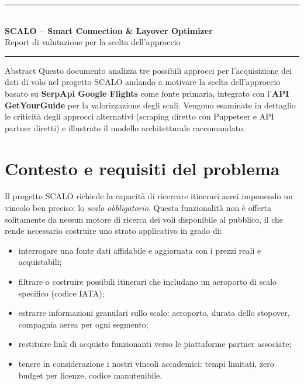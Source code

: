 \documentclass[a4paper, 11pt]{article}
\begin{document}
\begin{center}
  {\color{black}\rule{\textwidth}{2pt}}\\[10pt]
  {\fontsize{18}{16}\selectfont\bfseries\color{black}SCALO -- Smart Connection \& Layover Optimizer}\\[5pt]
  {\normalsize\color{muted}Report di valutazione per la scelta dell'approccio}\\[10pt]
  {\color{black}\rule{\textwidth}{2pt}}
\end{center}

\begin{infobox}{Abstract}
Questo documento analizza tre possibili approcci per l'acquisizione dei dati di volo nel progetto SCALO andando a motivare la scelta dell'approccio basato su \textbf{SerpApi Google Flights} come fonte primaria, integrato con l'\textbf{API GetYourGuide} per la valorizzazione degli scali. Vengono esaminate in dettaglio le criticità degli approcci alternativi (scraping diretto con Puppeteer e API partner diretti) e illustrato il modello architetturale raccomandato.
\end{infobox}

\tableofcontents
\newpage

\section{Contesto e requisiti del problema}

Il progetto SCALO richiede la capacità di ricercare itinerari aerei imponendo un vincolo ben preciso: lo \emph{scalo obbligatorio}. Questa funzionalit\`a non \`e offerta solitamente da nessun motore di ricerca dei voli disponibile al pubblico, il che rende necessario costruire uno strato applicativo in grado di:

\begin{itemize}
  \item interrogare una fonte dati affidabile e aggiornata con i prezzi reali e acquistabili;
  \item filtrare o costruire possibili itinerari che includano un aeroporto di scalo specifico (codice IATA);
  \item estrarre informazioni granulari sullo scalo: aeroporto, durata dello stopover, compagnia aerea per ogni segmento;
  \item restituire link di acquisto funzionanti verso le piattaforme partner associate;
  \item tenere in considerazione i nostri vincoli accademici: tempi limitati, zero budget per licenze, codice manutenibile.
\end{itemize}
\end{document}
